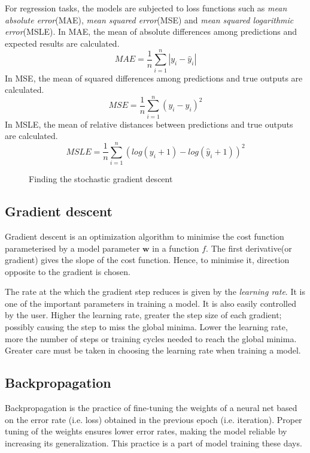 For regression tasks, the models are subjected to loss functions such as \textit{mean
absolute error}(MAE), \textit{mean squared error}(MSE) and \textit{mean squared
logarithmic error}(MSLE). In MAE, the mean of absolute differences among predictions and
expected results are calculated.
\begin{equation}
    MAE = \frac{1}{n}\sum_{i=1}^n\left |y_i -\hat y_i \right|
   \label{eq:MAE}
\end{equation}
In MSE, the mean of squared differences among predictions and true outputs are
calculated.
\begin{equation}
    MSE = \frac{1}{n}\sum_{i=1}^n (y_i - \hat y_i)^2
    \label{eq:MSE}
\end{equation}
In MSLE, the mean of relative distances between predictions and true outputs are
calculated.
\begin{equation}
    MSLE = \frac{1}{n}\sum_{i=1}^n(log(y_i+1)-log(\hat y_i+1))^2
    \label{eq:MSLE}
\end{equation}

\begin{figure}
	\centering
    \def\svgwidth{0.6\textwidth}
        
    \caption{Finding the stochastic gradient descent}
    \label{fig:gradientdescent}
\end{figure}


\subsection{Gradient descent}
\label{subsec:gradientdescent}
Gradient descent is an optimization algorithm to minimise the cost function parameterised by a
model parameter $\mathbf{w}$ in a function $f$. The first derivative(or gradient) gives the slope of the
cost function. Hence, to minimise it, direction opposite to the gradient is chosen.

The rate at the which the gradient step reduces is given by the \textit{learning rate}. It
is one of the important parameters in training a model. It is also easily controlled by
the user. Higher the learning rate, greater the step size of each gradient; possibly causing the
step to miss the global minima. Lower the learning rate, more the number of steps or training cycles
needed to reach the global minima. Greater care must be taken in choosing the learning
rate when training a model.

\subsection{Backpropagation}
\label{subsec:backpropagation}
Backpropagation is the practice of fine-tuning the weights of a neural net based on the error rate (i.e. loss) obtained in the previous epoch (i.e. iteration).
Proper tuning of the weights ensures lower error rates, making the model reliable by increasing its generalization.
This practice is a part of model training these days.

